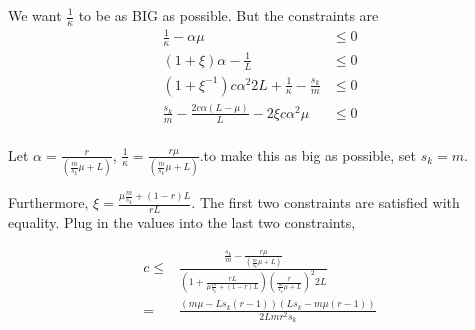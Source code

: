 \documentclass[12pt]{article}
\begin{document}
		We want $\frac{1}{\kappa}$ to be as BIG as possible. But the constraints are 
		\begin{align*}
			 \frac{1}{\kappa}- \alpha \mu &\leq 0 \\
			(1+\xi)\alpha - \frac{1 }{L}  &\leq 0 \\
			(1+\xi^{-1})c \alpha^2 2L+\frac{1}{\kappa}- \frac{s_k}{m}&\leq 0 \\
		    \frac{s_k}{m} -\frac{2c \alpha(L - \mu)}{L}- 2 \xi c \alpha^2 \mu &\leq 0 \\
		\end{align*}
		
		
		
		Let $\alpha = \frac{r}{(\frac{m}{s_k}\mu+L)}$, $\frac{1}{\kappa} = \frac{r \mu}{( \frac{m}{s_k}\mu+L)}$.to make this as big as possible, set $s_k = m$.
		
		Furthermore, $\xi =\frac{\mu \frac{m}{s_k}+(1-r)L}{r L } $. The first two constraints are satisfied with equality. Plug in the values into the last two constraints, 
		
			\begin{align*}
			c\leq &\frac{\frac{s_k}{m}- \frac{r \mu}{( \frac{m}{s_k}\mu+L)}}{(1+\frac{rL}{ \mu \frac{m}{s_k}+(1-r)L } ) ( \frac{r}{\frac{m}{s_k}\mu+L})^2 2L} \\
			=&\frac{( m \mu-L s_k (r-1) )(L s_k-m \mu (r-1))}{2 L m r^2 s_k}
			\end{align*}
	
\end{document}
